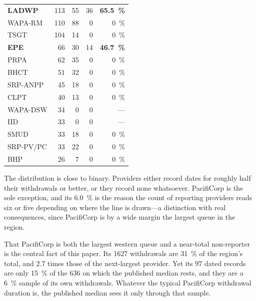 \documentclass[11pt,a4paper]{article}
\begin{document}
\begin{table}[htbp]
\begin{tabular}{lrrrr}
\textbf{LADWP}    & \num{113}  & \num{55}   & 36  & \textbf{\SI{65.5}{\percent}} \\
WAPA-RM           & \num{110}  & \num{88}   & 0   & \SI{0}{\percent} \\
TSGT              & \num{104}  & \num{14}   & 0   & \SI{0}{\percent} \\
\textbf{EPE}      & \num{66}   & \num{30}   & 14  & \textbf{\SI{46.7}{\percent}} \\
PRPA              & \num{62}   & \num{35}   & 0   & \SI{0}{\percent} \\
BHCT              & \num{51}   & \num{32}   & 0   & \SI{0}{\percent} \\
SRP-ANPP          & \num{45}   & \num{18}   & 0   & \SI{0}{\percent} \\
CLPT              & \num{40}   & \num{13}   & 0   & \SI{0}{\percent} \\
WAPA-DSW          & \num{34}   & 0          & 0   & --- \\
IID               & \num{33}   & 0          & 0   & --- \\
SMUD              & \num{33}   & \num{18}   & 0   & \SI{0}{\percent} \\
SRP-PV/PC         & \num{33}   & \num{22}   & 0   & \SI{0}{\percent} \\
BHP               & \num{26}   & \num{7}    & 0   & \SI{0}{\percent} \\
\bottomrule
\end{tabular}
\end{table}
\FloatBarrier

The distribution is close to binary. Providers either record dates for roughly
half their withdrawals or better, or they record none whatsoever. PacifiCorp is
the sole exception, and its \SI{6.0}{\percent} is the reason the count of
reporting providers reads six or five depending on where the line is drawn---a
distinction with real consequences, since PacifiCorp is by a wide margin the
largest queue in the region.

That PacifiCorp is both the largest western queue and a near-total non-reporter
is the central fact of this paper. Its \num{1627} withdrawals are
\SI{31}{\percent} of the region's total, and 2.7 times those of the next-largest
provider. Yet its 97 dated records are only \SI{15}{\percent} of the 636 on which
the published median rests, and they are a \SI{6}{\percent} sample of its own
withdrawals. Whatever the typical PacifiCorp withdrawal duration is, the
published median sees it only through that sample.
\end{document}
